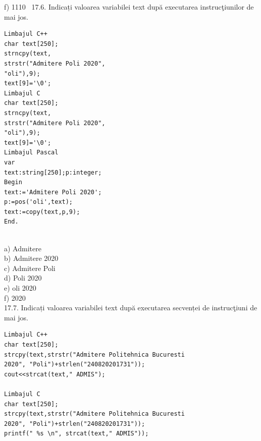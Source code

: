 {{f) 1110
\
17.6. Indicați valoarea variabilei text după executarea instrucţiunilor de mai jos.
\begin{verbatim}
Limbajul C++ 
char text[250]; 
strncpy(text, 
strstr("Admitere Poli 2020", 
"oli"),9); 
text[9]='\0';
Limbajul C 
char text[250]; 
strncpy(text, 
strstr("Admitere Poli 2020", 
"oli"),9); 
text[9]='\0';
Limbajul Pascal 
var 
text:string[250];p:integer; 
Begin 
text:='Admitere Poli 2020'; 
p:=pos('oli',text); 
text:=copy(text,p,9); 
End. 
\end{verbatim}
\\
a) Admitere
\\
b) Admitere 2020
\\
c) Admitere Poli
\\
d) Poli 2020
\\
e) oli 2020
\\
f) 2020
\\
17.7. Indicați valoarea variabilei text după executarea secvenței de instrucţiuni de mai jos.
\begin{verbatim}
Limbajul C++ 
char text[250]; 
strcpy(text,strstr("Admitere Politehnica Bucuresti 
2020", "Poli")+strlen("240820201731")); 
cout<<strcat(text," ADMIS"); 
 
Limbajul C 
char text[250]; 
strcpy(text,strstr("Admitere Politehnica Bucuresti 
2020", "Poli")+strlen("240820201731")); 
printf(" %s \n", strcat(text," ADMIS")); 
 

\end{verbatim}}}
